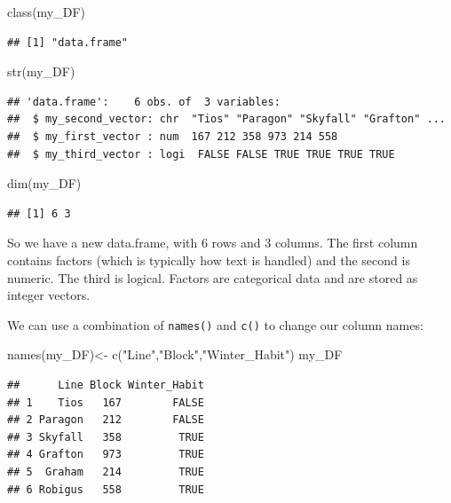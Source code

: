 \documentclass[
]{book}
\newenvironment{Shaded}{\begin{snugshade}}{\end{snugshade}}
\newcommand{\FunctionTok}[1]{\textcolor[rgb]{0.00,0.00,0.00}{#1}}
\newcommand{\NormalTok}[1]{#1}
\newcommand{\OtherTok}[1]{\textcolor[rgb]{0.56,0.35,0.01}{#1}}
\newcommand{\StringTok}[1]{\textcolor[rgb]{0.31,0.60,0.02}{#1}}
\begin{document}
\begin{Shaded}
\begin{Highlighting}[]
\FunctionTok{class}\NormalTok{(my\_DF)}
\end{Highlighting}
\end{Shaded}

\begin{verbatim}
## [1] "data.frame"
\end{verbatim}

\begin{Shaded}
\begin{Highlighting}[]
\FunctionTok{str}\NormalTok{(my\_DF)}
\end{Highlighting}
\end{Shaded}

\begin{verbatim}
## 'data.frame':    6 obs. of  3 variables:
##  $ my_second_vector: chr  "Tios" "Paragon" "Skyfall" "Grafton" ...
##  $ my_first_vector : num  167 212 358 973 214 558
##  $ my_third_vector : logi  FALSE FALSE TRUE TRUE TRUE TRUE
\end{verbatim}

\begin{Shaded}
\begin{Highlighting}[]
\FunctionTok{dim}\NormalTok{(my\_DF)}
\end{Highlighting}
\end{Shaded}

\begin{verbatim}
## [1] 6 3
\end{verbatim}

So we have a new data.frame, with 6 rows and 3 columns. The first column contains factors (which is typically how text is handled) and the second is numeric. The third is logical. Factors are categorical data and are stored as integer vectors.

We can use a combination of \texttt{names()} and \texttt{c()} to change our column names:

\begin{Shaded}
\begin{Highlighting}[]
\FunctionTok{names}\NormalTok{(my\_DF)}\OtherTok{\textless{}{-}} \FunctionTok{c}\NormalTok{(}\StringTok{"Line"}\NormalTok{,}\StringTok{"Block"}\NormalTok{,}\StringTok{"Winter\_Habit"}\NormalTok{)}
\NormalTok{my\_DF}
\end{Highlighting}
\end{Shaded}

\begin{verbatim}
##      Line Block Winter_Habit
## 1    Tios   167        FALSE
## 2 Paragon   212        FALSE
## 3 Skyfall   358         TRUE
## 4 Grafton   973         TRUE
## 5  Graham   214         TRUE
## 6 Robigus   558         TRUE
\end{verbatim}
\end{document}
